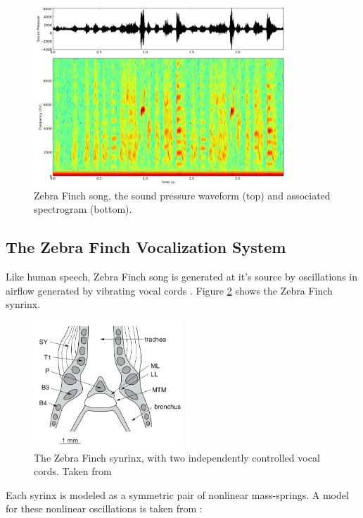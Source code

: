 \documentclass{article} %
\begin{document}
\begin{figure}[h]
\centering
\includegraphics[width=0.85\textwidth]{images/song.png}
\caption{Zebra Finch song, the sound pressure waveform (top) and associated spectrogram (bottom).}
\label{fig:song}
\end{figure}


\subsection{The Zebra Finch Vocalization System}

Like human speech, Zebra Finch song is generated at it's source by oscillations in airflow
generated by vibrating vocal cords \cite{Mindlin2005}. Figure \ref{fig:vocal_tract} shows the Zebra Finch
synrinx.

\begin{figure}[h]
\centering
\includegraphics[width=0.5\textwidth]{images/tracheobronchial_syrinx.png}
\caption{The Zebra Finch synrinx, with two independently controlled vocal cords. Taken from \cite{Mindlin2005}}
\label{fig:vocal_tract}
\end{figure}


Each syrinx is modeled as a symmetric pair of nonlinear mass-springs. A model for
these nonlinear oscillations is taken from \cite{Sitt2010}:
\end{document}
